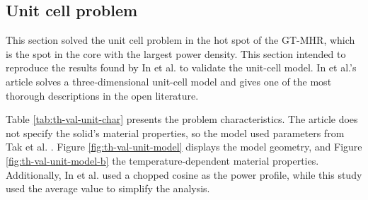 \subsection{Unit cell problem}
\label{sec:unitcell}

This section solved the unit cell problem in the hot spot of the GT-MHR, which is the spot in the core with the largest power density.
This section intended to reproduce the results found by In et al. \cite{in_three-dimensional_2006} to validate the unit-cell model.
In et al.'s article solves a three-dimensional unit-cell model and gives one of the most thorough descriptions in the open literature.

Table \ref{tab:th-val-unit-char} presents the problem characteristics.
The article does not specify the solid's material properties, so the model used parameters from Tak et al. \cite{tak_numerical_2008}.
Figure \ref{fig:th-val-unit-model} displays the model geometry, and Figure \ref{fig:th-val-unit-model-b} the temperature-dependent material properties.
Additionally, In et al. used a chopped cosine as the power profile, while this study used the average value to simplify the analysis.

